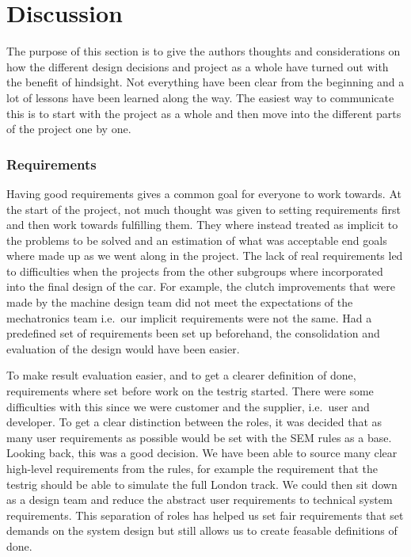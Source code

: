 \chapter{Discussion}
The purpose of this section is to give the authors thoughts and considerations
on how the different design decisions and project as a whole have turned out
with the benefit of hindsight. Not everything have been clear from the beginning
and a lot of lessons have been learned along the way. The easiest way to
communicate this is to start with the project as a whole and then move into the
different parts of the project one by one. 

\subsection{Requirements}
Having good requirements gives a common goal for everyone to work towards. At
the start of the project, not much thought was given to setting requirements
first and then work towards fulfilling them. They where instead treated as
implicit to the problems to be solved and an estimation of what was acceptable
end goals where made up as we went along in the project. The lack of real
requirements led to difficulties when the projects from the other subgroups
where incorporated into the final design of the car. For example, the clutch
improvements that were made by the machine design team did not meet the
expectations of the mechatronics team i.e.\ our implicit requirements were not
the same. Had a predefined set of requirements been set up beforehand, the
consolidation and evaluation of the design would have been easier.

To make result evaluation easier, and to get a clearer definition of done,
requirements where set before work on the testrig started. There were some
difficulties with this since we were customer and the supplier, i.e.\ user and
developer. To get a clear distinction between the roles, it was decided that as
many user requirements as possible would be set with the SEM rules as a base.
Looking back, this was a good decision. We have been able to source many clear
high-level requirements from the rules, for example the requirement that the
testrig should be able to simulate the full London track. We could then sit down
as a design team and reduce the abstract user requirements to technical system
requirements. This separation of roles has helped us set fair requirements that
set demands on the system design but still allows us to create feasable
definitions of done. 

